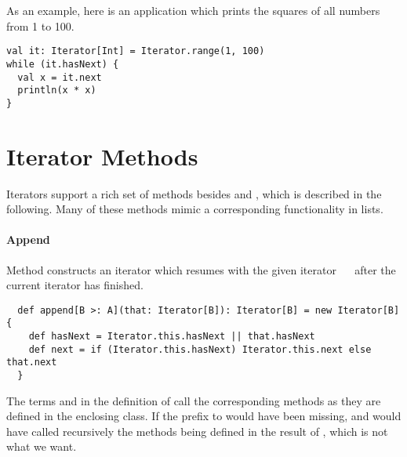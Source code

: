 {As an example, here is an application which prints the squares of all
numbers from 1 to 100.
\begin{lstlisting}
val it: Iterator[Int] = Iterator.range(1, 100)
while (it.hasNext) {
  val x = it.next
  println(x * x)
}
\end{lstlisting}

\section{Iterator Methods}

Iterators support a rich set of methods besides  and
, which is described in the following. Many of these
methods mimic a corresponding functionality in lists.

\paragraph{Append}
Method  constructs an iterator which resumes with the
given iterator ~~ after the current iterator has finished.
\begin{lstlisting}
  def append[B >: A](that: Iterator[B]): Iterator[B] = new Iterator[B] {
    def hasNext = Iterator.this.hasNext || that.hasNext
    def next = if (Iterator.this.hasNext) Iterator.this.next else that.next
  }    
\end{lstlisting}
The terms  and 
in the definition of  call the corresponding methods as
they are defined in the enclosing  class.  If the
 prefix to  would have been missing,
 and  would have called recursively the
methods being defined in the result of , which is not
what we want.

}
